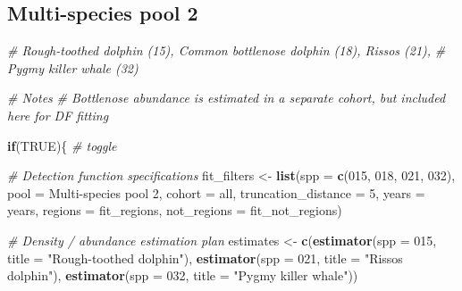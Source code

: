 \documentclass[
]{book}
\newenvironment{Shaded}{\begin{snugshade}}{\end{snugshade}}
\newcommand{\AttributeTok}[1]{\textcolor[rgb]{0.13,0.29,0.53}{#1}}
\newcommand{\CommentTok}[1]{\textcolor[rgb]{0.56,0.35,0.01}{\textit{#1}}}
\newcommand{\ConstantTok}[1]{\textcolor[rgb]{0.56,0.35,0.01}{#1}}
\newcommand{\ControlFlowTok}[1]{\textcolor[rgb]{0.13,0.29,0.53}{\textbf{#1}}}
\newcommand{\DecValTok}[1]{\textcolor[rgb]{0.00,0.00,0.81}{#1}}
\newcommand{\FunctionTok}[1]{\textcolor[rgb]{0.13,0.29,0.53}{\textbf{#1}}}
\newcommand{\NormalTok}[1]{#1}
\newcommand{\OtherTok}[1]{\textcolor[rgb]{0.56,0.35,0.01}{#1}}
\newcommand{\StringTok}[1]{\textcolor[rgb]{0.31,0.60,0.02}{#1}}
\begin{document}
\hypertarget{multi-species-pool-2}{%
\subsection*{Multi-species pool 2}\label{multi-species-pool-2}}

\begin{Shaded}
\begin{Highlighting}[]
\CommentTok{\# Rough{-}toothed dolphin (15), Common bottlenose dolphin (18), Risso\textquotesingle{}s (21),}
\CommentTok{\# Pygmy killer whale (32)}

\CommentTok{\# Notes}
\CommentTok{\# Bottlenose abundance is estimated in a separate cohort, but included here for DF fitting}

\ControlFlowTok{if}\NormalTok{(}\ConstantTok{TRUE}\NormalTok{)\{ }\CommentTok{\# toggle}

  \CommentTok{\# Detection function specifications}
\NormalTok{  fit\_filters }\OtherTok{\textless{}{-}}
    \FunctionTok{list}\NormalTok{(}\AttributeTok{spp =} \FunctionTok{c}\NormalTok{(}\StringTok{\textquotesingle{}015\textquotesingle{}}\NormalTok{, }\StringTok{\textquotesingle{}018\textquotesingle{}}\NormalTok{, }\StringTok{\textquotesingle{}021\textquotesingle{}}\NormalTok{, }\StringTok{\textquotesingle{}032\textquotesingle{}}\NormalTok{),}
         \AttributeTok{pool =} \StringTok{\textquotesingle{}Multi{-}species pool 2\textquotesingle{}}\NormalTok{,}
         \AttributeTok{cohort =} \StringTok{\textquotesingle{}all\textquotesingle{}}\NormalTok{,}
         \AttributeTok{truncation\_distance =} \DecValTok{5}\NormalTok{,}
         \AttributeTok{years =}\NormalTok{ years,}
         \AttributeTok{regions =}\NormalTok{ fit\_regions,}
         \AttributeTok{not\_regions =}\NormalTok{ fit\_not\_regions)}

  \CommentTok{\# Density / abundance estimation plan}
\NormalTok{  estimates }\OtherTok{\textless{}{-}}
      \FunctionTok{c}\NormalTok{(}\FunctionTok{estimator}\NormalTok{(}\AttributeTok{spp =} \StringTok{\textquotesingle{}015\textquotesingle{}}\NormalTok{, }\AttributeTok{title =} \StringTok{"Rough{-}toothed dolphin"}\NormalTok{),}
        \FunctionTok{estimator}\NormalTok{(}\AttributeTok{spp =} \StringTok{\textquotesingle{}021\textquotesingle{}}\NormalTok{, }\AttributeTok{title =} \StringTok{"Risso\textquotesingle{}s dolphin"}\NormalTok{),}
        \FunctionTok{estimator}\NormalTok{(}\AttributeTok{spp =} \StringTok{\textquotesingle{}032\textquotesingle{}}\NormalTok{, }\AttributeTok{title =} \StringTok{"Pygmy killer whale"}\NormalTok{))}


\end{Highlighting}
\end{Shaded}
\end{document}
